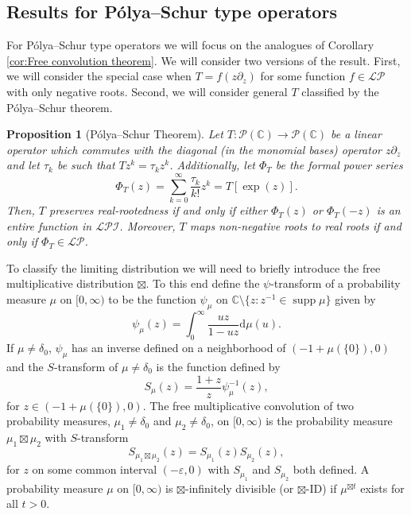 \documentclass[reqno]{amsart}
\newcommand{\1}{\mathbf{1}}
\DeclareMathOperator{\supp}{supp}
\newcommand{\dd}{\mathrm{d}}
\newcommand{\C}{\mathbb{C}}
\newcommand{\eps}{\varepsilon}
\newcommand{\LP}{\mathcal{LP}}
\theoremstyle{plain}
\newtheorem{proposition}[theorem]{Proposition}
\theoremstyle{definition}
\theoremstyle{remark}
\numberwithin{equation}{section}
\begin{document}
\subsection{Results for P\'olya--Schur type operators}
For P\'olya--Schur type operators we will focus on the analogues of Corollary \ref{cor:Free convolution theorem}. We will consider two versions of the result. First, we will consider the special case when $T=f(z\partial_{z})$ for some function $f\in\LP$ with only negative roots. Second, we will consider general $T$ classified by the P\'olya--Schur theorem.\begin{proposition}[P\'olya--Schur Theorem]\label{prop:Polya-Schur}
	Let $T:\mathcal{P}(\C)\rightarrow\mathcal{P}(\C)$ be a linear operator which commutes with the diagonal (in the monomial bases) operator $z\partial_{z}$ and let $\tau_k$ be such that $Tz^k=\tau_kz^k$. Additionally, let $\Phi_{T}$ be the formal power series \begin{equation}\label{eq:Phi_T def}
		\Phi_{T}(z)=\sum_{k=0}^{\infty}\frac{\tau_k}{k!}z^{k}=T\left[\exp( z)\right].
	\end{equation} Then, $T$ preserves real-rootedness if and only if either $\Phi_{T}(z)$ or $\Phi_{T}(-z)$ is an entire function in $\mathcal{LPI}$. Moreover, $T$ maps non-negative roots to real roots if and only if $\Phi_{T}\in\LP$. 
\end{proposition}
	To classify the limiting distribution we will need to briefly introduce the free multiplicative distribution $\boxtimes$. To this end define the $\psi$-transform of a probability measure $\mu$ on $[0,\infty)$ to be the function $\psi_\mu$  on $\C\setminus\{z:z^{-1}\in\supp\mu\}$ given by 
\begin{equation}
	\psi_\mu(z)=\int_{0}^{\infty}\frac{uz}{1-uz}\dd\mu(u).
\end{equation} If $\mu\neq\delta_{0}$, $\psi_\mu$ has an inverse defined on a neighborhood of $(-1+\mu(\{0\}),0)$ and the $S$-transform of $\mu\neq \delta_{0}$ is the function defined by \begin{equation}
	S_{\mu}(z)=\frac{1+z}{z}\psi_\mu^{-1}(z),
\end{equation}  for $z\in(-1+\mu(\{0\}),0)$.  The free multiplicative convolution of two probability measures,  $\mu_{1}\neq \delta_0$ and $\mu_{2}\neq\delta_{0}$, on $[0,\infty)$ is the probability  measure $\mu_{1}\boxtimes\mu_{2}$ with $S$-transform \begin{equation}
	S_{\mu_{1}\boxtimes\mu_{2}}(z)=S_{\mu_{1}}(z)S_{\mu_{2}}(z),
\end{equation} for $z$ on some common interval $(-\eps,0)$ with $S_{\mu_{1}}$ and $S_{\mu_{2}}$ both defined. A probability measure $\mu$ on $[0,\infty)$ is $\boxtimes$-infinitely divisible (or $\boxtimes$-ID) if $\mu^{\boxtimes t}$ exists for all $t>0$. 
\end{document}
